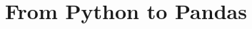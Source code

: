 \documentclass{book}
\begin{document}

\frontmatter



%

\mainmatter

\part{From Python to Pandas}



\backmatter
\end{document}
